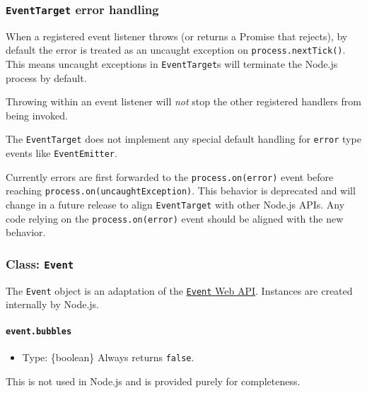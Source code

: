\subsubsection{\texorpdfstring{\texttt{EventTarget} error
handling}{EventTarget error handling}}\label{eventtarget-error-handling}

When a registered event listener throws (or returns a Promise that
rejects), by default the error is treated as an uncaught exception on
\texttt{process.nextTick()}. This means uncaught exceptions in
\texttt{EventTarget}s will terminate the Node.js process by default.

Throwing within an event listener will \emph{not} stop the other
registered handlers from being invoked.

The \texttt{EventTarget} does not implement any special default handling
for \texttt{\textquotesingle{}error\textquotesingle{}} type events like
\texttt{EventEmitter}.

Currently errors are first forwarded to the
\texttt{process.on(\textquotesingle{}error\textquotesingle{})} event
before reaching
\texttt{process.on(\textquotesingle{}uncaughtException\textquotesingle{})}.
This behavior is deprecated and will change in a future release to align
\texttt{EventTarget} with other Node.js APIs. Any code relying on the
\texttt{process.on(\textquotesingle{}error\textquotesingle{})} event
should be aligned with the new behavior.

\subsubsection{\texorpdfstring{Class:
\texttt{Event}}{Class: Event}}\label{class-event}

The \texttt{Event} object is an adaptation of the
\href{https://dom.spec.whatwg.org/\#event}{\texttt{Event} Web API}.
Instances are created internally by Node.js.

\paragraph{\texorpdfstring{\texttt{event.bubbles}}{event.bubbles}}\label{event.bubbles}

\begin{itemize}
\tightlist
\item
  Type: \{boolean\} Always returns \texttt{false}.
\end{itemize}

This is not used in Node.js and is provided purely for completeness.

